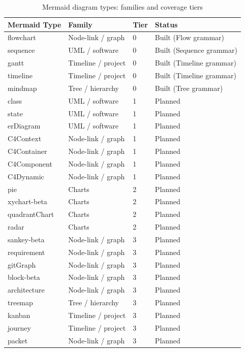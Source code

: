 \begin{table}[h]
\centering\small
\caption{Mermaid diagram types: families and coverage tiers}
\begin{tabular}{llll}
\toprule
\textbf{Mermaid Type} & \textbf{Family} & \textbf{Tier} & \textbf{Status} \\
\midrule
flowchart       & Node-link / graph     & 0 & Built (Flow grammar) \\
sequence        & UML / software        & 0 & Built (Sequence grammar) \\
gantt           & Timeline / project    & 0 & Built (Timeline grammar) \\
timeline        & Timeline / project    & 0 & Built (Timeline grammar) \\
mindmap         & Tree / hierarchy      & 0 & Built (Tree grammar) \\
\midrule
class           & UML / software        & 1 & Planned \\
state           & UML / software        & 1 & Planned \\
erDiagram       & UML / software        & 1 & Planned \\
C4Context       & Node-link / graph     & 1 & Planned \\
C4Container     & Node-link / graph     & 1 & Planned \\
C4Component     & Node-link / graph     & 1 & Planned \\
C4Dynamic       & Node-link / graph     & 1 & Planned \\
\midrule
pie             & Charts                & 2 & Planned \\
xychart-beta    & Charts                & 2 & Planned \\
quadrantChart   & Charts                & 2 & Planned \\
radar           & Charts                & 2 & Planned \\
\midrule
sankey-beta     & Node-link / graph     & 3 & Planned \\
requirement     & Node-link / graph     & 3 & Planned \\
gitGraph        & Node-link / graph     & 3 & Planned \\
block-beta      & Node-link / graph     & 3 & Planned \\
architecture    & Node-link / graph     & 3 & Planned \\
treemap         & Tree / hierarchy      & 3 & Planned \\
kanban          & Timeline / project    & 3 & Planned \\
journey         & Timeline / project    & 3 & Planned \\
packet          & Node-link / graph     & 3 & Planned \\
\bottomrule
\end{tabular}
\label{tab:mermaid-coverage}
\end{table}

